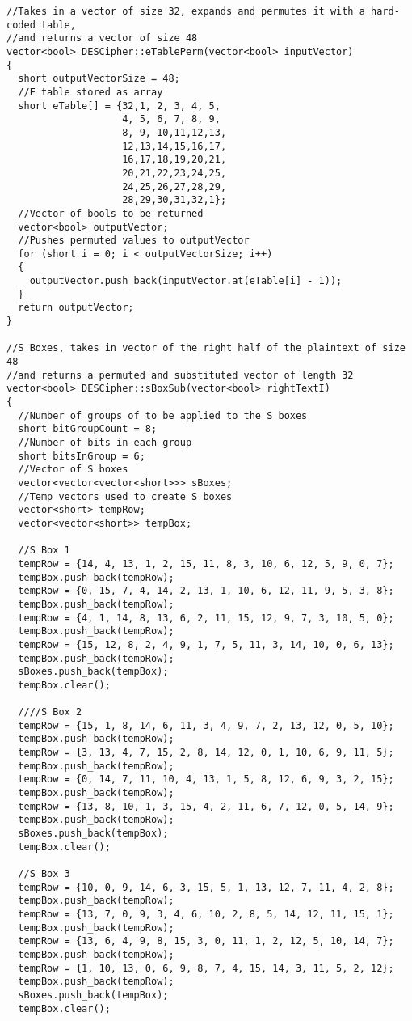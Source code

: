 \documentclass[11pt]{article}
\begin{document}
\begin{verbatim}
//Takes in a vector of size 32, expands and permutes it with a hard-coded table,
//and returns a vector of size 48
vector<bool> DESCipher::eTablePerm(vector<bool> inputVector)
{
  short outputVectorSize = 48;
  //E table stored as array
  short eTable[] = {32,1, 2, 3, 4, 5,
                    4, 5, 6, 7, 8, 9,
                    8, 9, 10,11,12,13,
                    12,13,14,15,16,17,
                    16,17,18,19,20,21,
                    20,21,22,23,24,25,
                    24,25,26,27,28,29,
                    28,29,30,31,32,1};
  //Vector of bools to be returned
  vector<bool> outputVector;
  //Pushes permuted values to outputVector
  for (short i = 0; i < outputVectorSize; i++)
  {
    outputVector.push_back(inputVector.at(eTable[i] - 1));
  }
  return outputVector;
}

//S Boxes, takes in vector of the right half of the plaintext of size 48
//and returns a permuted and substituted vector of length 32
vector<bool> DESCipher::sBoxSub(vector<bool> rightTextI)
{
  //Number of groups of to be applied to the S boxes
  short bitGroupCount = 8;
  //Number of bits in each group
  short bitsInGroup = 6;
  //Vector of S boxes
  vector<vector<vector<short>>> sBoxes;
  //Temp vectors used to create S boxes
  vector<short> tempRow;
  vector<vector<short>> tempBox;

  //S Box 1
  tempRow = {14, 4, 13, 1, 2, 15, 11, 8, 3, 10, 6, 12, 5, 9, 0, 7};
  tempBox.push_back(tempRow);
  tempRow = {0, 15, 7, 4, 14, 2, 13, 1, 10, 6, 12, 11, 9, 5, 3, 8};
  tempBox.push_back(tempRow);
  tempRow = {4, 1, 14, 8, 13, 6, 2, 11, 15, 12, 9, 7, 3, 10, 5, 0};
  tempBox.push_back(tempRow);
  tempRow = {15, 12, 8, 2, 4, 9, 1, 7, 5, 11, 3, 14, 10, 0, 6, 13};
  tempBox.push_back(tempRow);
  sBoxes.push_back(tempBox);
  tempBox.clear();

  ////S Box 2
  tempRow = {15, 1, 8, 14, 6, 11, 3, 4, 9, 7, 2, 13, 12, 0, 5, 10};
  tempBox.push_back(tempRow);
  tempRow = {3, 13, 4, 7, 15, 2, 8, 14, 12, 0, 1, 10, 6, 9, 11, 5};
  tempBox.push_back(tempRow);
  tempRow = {0, 14, 7, 11, 10, 4, 13, 1, 5, 8, 12, 6, 9, 3, 2, 15};
  tempBox.push_back(tempRow);
  tempRow = {13, 8, 10, 1, 3, 15, 4, 2, 11, 6, 7, 12, 0, 5, 14, 9};
  tempBox.push_back(tempRow);
  sBoxes.push_back(tempBox);
  tempBox.clear();

  //S Box 3
  tempRow = {10, 0, 9, 14, 6, 3, 15, 5, 1, 13, 12, 7, 11, 4, 2, 8};
  tempBox.push_back(tempRow);
  tempRow = {13, 7, 0, 9, 3, 4, 6, 10, 2, 8, 5, 14, 12, 11, 15, 1};
  tempBox.push_back(tempRow);
  tempRow = {13, 6, 4, 9, 8, 15, 3, 0, 11, 1, 2, 12, 5, 10, 14, 7};
  tempBox.push_back(tempRow);
  tempRow = {1, 10, 13, 0, 6, 9, 8, 7, 4, 15, 14, 3, 11, 5, 2, 12};
  tempBox.push_back(tempRow);
  sBoxes.push_back(tempBox);
  tempBox.clear();


\end{verbatim}
\end{document}
